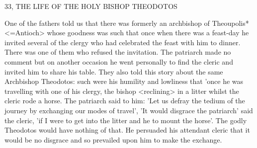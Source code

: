33, THE LIFE OF THE HOLY BISHOP THEODOTOS

One of the fathers told us that there was formerly an archbishop of
Theoupolis* <=Antioch> whose goodness was such that once when
there was a feast-day he invited several of the clergy who had
celebrated the feast with him to dinner. There was one of them who
refused the invitation. The patriarch made no comment but on
another occasion he went personally to find the cleric and invited
him to share his table. They also told this story about the same
Archbishop Theodotos: such were his humility and lowliness that
'once he was travelling with one of his clergy, the bishop <reclining>
in a litter whilst the cleric rode a horse. The patriarch said to him:
'Let us defray the tedium of the journey by exchanging our modes
of travel', 'It would disgrace the patriarch' said the cleric, 'if I were
to get into the litter and he to mount the horse'. The godly
Theodotos would have nothing of that. He persuaded his attendant
cleric that it would be no disgrace and so prevailed upon him to
make the exchange.

